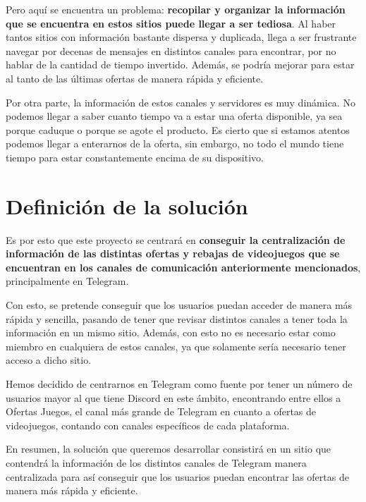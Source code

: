 Pero aquí se encuentra un problema: \textbf{recopilar y organizar la información 
que se encuentra en estos sitios puede llegar a ser tediosa}. Al haber tantos 
sitios con información bastante dispersa y duplicada, llega a ser frustrante 
navegar por decenas de mensajes en distintos canales para encontrar, por no hablar 
de la cantidad de tiempo invertido. Además, se podría mejorar para estar al tanto 
de las últimas ofertas de manera rápida y eficiente.

Por otra parte, la información de estos canales y servidores es muy dinámica. No 
podemos llegar a saber cuanto tiempo va a estar una oferta disponible, ya sea 
porque caduque o porque se agote el producto. Es cierto que si estamos atentos 
podemos llegar a enterarnos de la oferta, sin embargo, no todo el mundo tiene tiempo 
para estar constantemente encima de su dispositivo.

\section{Definición de la solución}

Es por esto que este proyecto se centrará en \textbf{conseguir la centralización de 
información de las distintas ofertas y rebajas de videojuegos que se encuentran en 
los canales de comunicación anteriormente mencionados}, principalmente en Telegram.

Con esto, se pretende conseguir que los usuarios puedan acceder de manera más 
rápida y sencilla, pasando de tener que revisar distintos canales a tener toda la 
información en un mismo sitio. Además, con esto no es necesario estar como miembro 
en cualquiera de estos canales, ya que solamente sería necesario tener acceso a 
dicho sitio.

Hemos decidido de centrarnos en Telegram como fuente por tener un número de 
usuarios mayor al que tiene Discord en este ámbito, encontrando entre ellos a 
Ofertas Juegos, el canal más grande de Telegram en cuanto a ofertas de videojuegos, 
contando con canales específicos de cada plataforma.

En resumen, la solución que queremos desarrollar consistirá en un sitio que 
contendrá la información de los distintos canales de Telegram manera centralizada 
para así conseguir que los usuarios puedan encontrar las ofertas de manera más 
rápida y eficiente.
